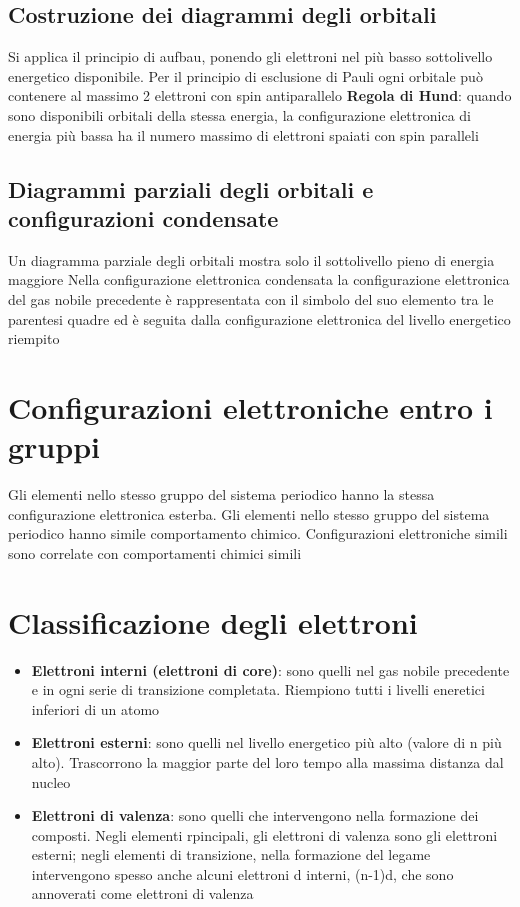 \documentclass[a4paper,11pt]{report}
\begin{document}
\subsection*{Costruzione dei diagrammi degli orbitali}

Si applica il principio di aufbau, ponendo gli elettroni nel più basso sottolivello energetico disponibile. Per il principio di esclusione di Pauli ogni orbitale può contenere al massimo 2 elettroni con spin antiparallelo \newline
\textbf{Regola di Hund}: quando sono disponibili orbitali della stessa energia, la configurazione elettronica di energia più bassa ha il numero massimo di elettroni spaiati con spin paralleli

\subsection*{Diagrammi parziali degli orbitali e configurazioni condensate}

Un diagramma parziale degli orbitali mostra solo il sottolivello pieno di energia maggiore \newline
Nella configurazione elettronica condensata la configurazione elettronica del gas nobile precedente è rappresentata con il simbolo del suo elemento tra le parentesi quadre ed è seguita dalla configurazione elettronica del livello energetico riempito

\section{Configurazioni elettroniche entro i gruppi}

Gli elementi nello stesso gruppo del sistema periodico hanno la stessa configurazione elettronica esterba. Gli elementi nello stesso gruppo del sistema periodico hanno simile comportamento chimico. 
Configurazioni elettroniche simili sono correlate con comportamenti chimici simili

\section{Classificazione degli elettroni}

\begin{itemize}
	\item \textbf{Elettroni interni (elettroni di core)}: sono quelli nel gas nobile precedente e in ogni serie di transizione completata. Riempiono tutti i livelli eneretici inferiori di un atomo
	\item \textbf{Elettroni esterni}: sono quelli nel livello energetico più alto (valore di n più alto). Trascorrono la maggior parte del loro tempo alla massima distanza dal nucleo
	\item \textbf{Elettroni di valenza}: sono quelli che intervengono nella formazione dei composti. Negli elementi rpincipali, gli elettroni di valenza sono gli elettroni esterni; negli elementi di transizione, nella formazione del legame intervengono spesso anche alcuni elettroni d interni, (n-1)d, che sono annoverati come elettroni di valenza
\end{itemize}
\end{document}
